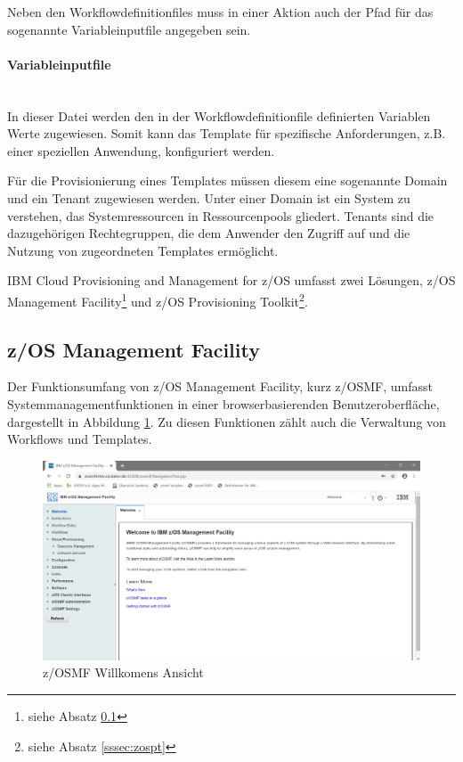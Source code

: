 Neben den Workflowdefinitionfiles muss in einer Aktion auch der Pfad für das sogenannte \glqq Variableinputfile\grqq{} angegeben sein.
\cite{.26.2.2020}

\paragraph{\glqq Variableinputfile\grqq}\label{par:variable} ~\\
In dieser Datei werden den in der Workflowdefinitionfile definierten Variablen Werte zugewiesen.
Somit kann das Template für spezifische Anforderungen, z.B. einer speziellen Anwendung,  konfiguriert werden.

Für die Provisionierung eines Templates müssen diesem eine sogenannte \glqq Domain\grqq{} und ein \glqq Tenant\grqq{} zugewiesen werden.
Unter einer \glqq Domain\grqq{} ist ein System zu verstehen, das Systemressourcen in Ressourcenpools gliedert.
\glqq Tenants\grqq{} sind die dazugehörigen Rechtegruppen, die dem Anwender den Zugriff auf und die Nutzung von zugeordneten Templates ermöglicht.
\cite[S. 15]{Keith.2016}

\glqq IBM Cloud Provisioning and Management for z/OS\grqq{} umfasst zwei Lösungen, \glqq z/OS Management Facility\grqq\footnote{siehe Absatz \ref{sssec:zosmf}} und \glqq z/OS Provisioning Toolkit\grqq\footnote{siehe Absatz \ref{sssec:zospt}}.

\subsection{z/OS Management Facility}\label{sssec:zosmf}
Der Funktionsumfang von z/OS Management Facility, kurz z/OSMF, umfasst Systemmanagementfunktionen
in einer browserbasierenden Benutzeroberfläche, dargestellt in Abbildung \ref{fig:zosmf_welcome}.
Zu diesen Funktionen zählt auch die Verwaltung von Workflows und Templates.

\begin{figure}[h]
\centering
\includegraphics[width=\textwidth]{figures/zosmf.png}
\caption{z/OSMF Willkomens Ansicht}
\label{fig:zosmf_welcome}
\end{figure}


